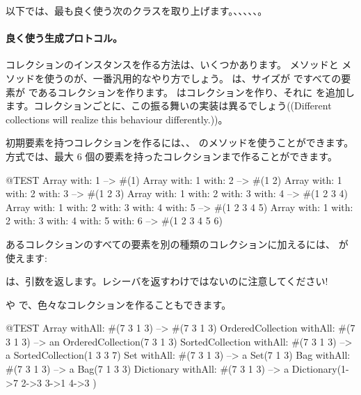 \documentclass[a4paper,10pt,twoside]{book}
\begin{document}
以下では、最も良く使う次のクラスを取り上げます。、、、、、。

\paragraph{良く使う生成プロトコル。}
コレクションのインスタンスを作る方法は、いくつかあります。 メソッドと  メソッドを使うのが、一番汎用的なやり方でしょう。 は、サイズが  ですべての要素が  であるコレクションを作ります。  はコレクションを作り、それに  を追加します。コレクションごとに、この振る舞いの実装は異るでしょう((Different collections will realize this behaviour differently.))。

初期要素を持つコレクションを作るには、、 \etc のメソッドを使うことができます。 方式では、最大 6 個の要素を持ったコレクションまで作ることができます。

\begin{code}{@TEST}
Array with: 1 --> #(1)
Array with: 1 with: 2 --> #(1 2)
Array with: 1 with: 2 with: 3 --> #(1 2 3)
Array with: 1 with: 2 with: 3 with: 4 --> #(1 2 3 4)
Array with: 1 with: 2 with: 3 with: 4 with: 5 --> #(1 2 3 4 5)
Array with: 1 with: 2 with: 3 with: 4 with: 5 with: 6 --> #(1 2 3 4 5 6)
\end{code}

あるコレクションのすべての要素を別の種類のコレクションに加えるには、 が使えます:

\noindent
{} は、引数を返します。レシーバを返すわけではないのに注意してください!

 や  で、色々なコレクションを作ることもできます。

\begin{code}{@TEST}
Array withAll: #(7 3 1 3)                      --> #(7 3 1 3)
OrderedCollection withAll: #(7 3 1 3) --> an OrderedCollection(7 3 1 3)
SortedCollection withAll: #(7 3 1 3)    --> a SortedCollection(1 3 3 7)
Set withAll: #(7 3 1 3)                         --> a Set(7 1 3)
Bag withAll: #(7 3 1 3)                        --> a Bag(7 1 3 3)
Dictionary withAll: #(7 3 1 3)               --> a Dictionary(1->7 2->3 3->1 4->3 )
\end{code}
\end{document}
